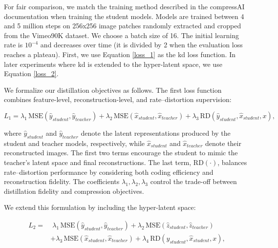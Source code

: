 \documentclass{article}
\begin{document}
For fair comparison, we match the training method described in the compressAI documentation \cite{compressai_train} when training the student models. Models are trained between 4 and 5 million steps on 256x256 image patches randomly extracted and cropped from the Vimeo90K dataset. We choose a batch size of 16. The initial learning rate is \(10^{-4}\) and decreases over time (it is divided by 2 when the evaluation loss reaches a plateau). First, we use Equation \ref{loss_1} as the \acrshort{kd} loss function. In later experiments where \acrshort{kd} is extended to the hyper-latent space, we use Equation \ref{loss_2}.

We formalize our distillation objectives as follows. The first loss function combines
feature-level, reconstruction-level, and rate–distortion supervision:

\begin{equation}
    L_{1} = \lambda_{1}\,\mathrm{MSE}(\hat{y}_{student}, \hat{y}_{teacher})
          + \lambda_{2}\,\mathrm{MSE}(\hat{x}_{student}, \hat{x}_{teacher})
          + \lambda_{3}\,\mathrm{RD}(\hat{y}_{student}, \hat{x}_{student}, x),
    \label{loss_1}
\end{equation}

where \(\hat{y}_{student}\) and \(\hat{y}_{teacher}\) denote the latent representations produced by the
student and teacher models, respectively, while \(\hat{x}_{student}\) and \(\hat{x}_{teacher}\) denote
their reconstructed images. The first two terms encourage the student to mimic the
teacher’s latent space and final reconstructions. The last term, \(\mathrm{RD}(\cdot)\),
balances rate–distortion performance by considering both coding efficiency and
reconstruction fidelity. The coefficients \(\lambda_{1},\lambda_{2},\lambda_{3}\) control the
trade-off between distillation fidelity and compression objectives.

\medskip
We extend this formulation by including the hyper-latent space:

\begin{equation}
\begin{split}
    L_{2} = &\;\lambda_{1}\,\mathrm{MSE}(\hat{y}_{student}, \hat{y}_{teacher})
           + \lambda_{2}\,\mathrm{MSE}(\hat{z}_{student}, \hat{z}_{teacher}) \\
           &+ \lambda_{3}\,\mathrm{MSE}(\hat{x}_{student}, \hat{x}_{teacher})
           + \lambda_{4}\,\mathrm{RD}(\hat{y}_{student}, \hat{x}_{student}, x),
\end{split}
\label{loss_2}
\end{equation}
\end{document}
